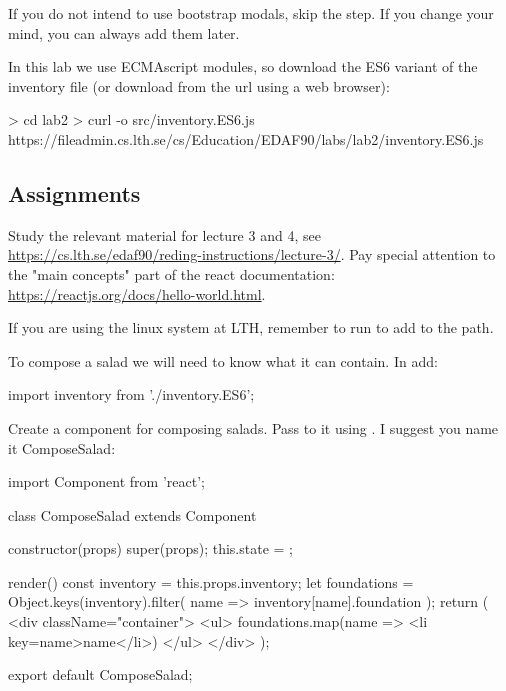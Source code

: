 \documentclass[fleqn, article, a4paper]{memoir}
\begin{document}
\noindent If you do not intend to use bootstrap modals, skip the  step. If you change your mind, you can always add them later.

In this lab we use ECMAscript modules, so download the ES6 variant of the inventory file (or download from the url using a web browser):
\begin{Code}
> cd lab2
> curl -o src/inventory.ES6.js 
          https://fileadmin.cs.lth.se/cs/Education/EDAF90/labs/lab2/inventory.ES6.js
\end{Code}

\subsection*{Assignments}

\begin{Assignments}

\item Study the relevant material for lecture 3 and 4, see \url{https://cs.lth.se/edaf90/reding-instructions/lecture-3/}. Pay special attention to the "main concepts" part of the react documentation: \url{https://reactjs.org/docs/hello-world.html}.

\item If you are using the linux system at LTH, remember to run  to add  to the path.

\item To compose a salad we will need to know what it can contain. In  add:
\begin{Code}
import inventory from './inventory.ES6';
\end{Code}

\item Create a component for composing salads. Pass  to it using . I suggest you name it ComposeSalad:
\begin{Code}
import { Component } from 'react';

class ComposeSalad extends Component {
  constructor(props) {
    super(props);
    this.state = {};
  }

  render() {
    const inventory = this.props.inventory;
    let foundations = Object.keys(inventory).filter(
      name => inventory[name].foundation
    );
    return (
      <div className="container">
        <ul>
          {foundations.map(name => <li key={name}>{name}</li>)}
        </ul>
      </div>
    );
  }
}

export default ComposeSalad;
\end{Code}


\end{Assignments}
\end{document}
